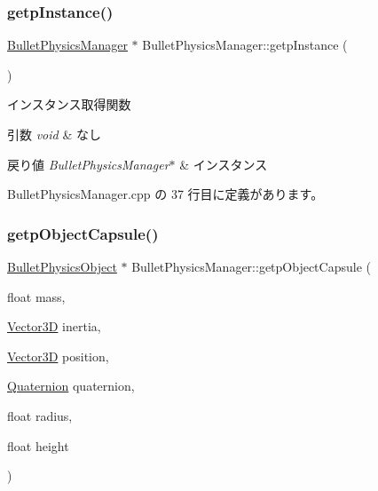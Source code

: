 \mbox{\label{class_bullet_physics_manager_a7ac6a8bba52b259931695ae85ded80d1}} 
\subsubsection{\texorpdfstring{getp\+Instance()}{getpInstance()}}
{\footnotesize\ttfamily \mbox{\hyperlink{class_bullet_physics_manager}{Bullet\+Physics\+Manager}} $\ast$ Bullet\+Physics\+Manager\+::getp\+Instance (\begin{DoxyParamCaption}{ }\end{DoxyParamCaption})\hspace{0.3cm}{\ttfamily [static]}}



インスタンス取得関数 


\begin{DoxyParams}{引数}
{\em void} & なし \\
\hline
\end{DoxyParams}

\begin{DoxyRetVals}{戻り値}
{\em Bullet\+Physics\+Manager$\ast$} & インスタンス \\
\hline
\end{DoxyRetVals}


 Bullet\+Physics\+Manager.\+cpp の 37 行目に定義があります。

\mbox{\label{class_bullet_physics_manager_aa923016c3a46597009f0b399dee189ec}} 
\subsubsection{\texorpdfstring{getp\+Object\+Capsule()}{getpObjectCapsule()}}
{\footnotesize\ttfamily \mbox{\hyperlink{class_bullet_physics_object}{Bullet\+Physics\+Object}} $\ast$ Bullet\+Physics\+Manager\+::getp\+Object\+Capsule (\begin{DoxyParamCaption}\item[{float}]{mass,  }\item[{\mbox{\hyperlink{class_vector3_d}{Vector3D}}}]{inertia,  }\item[{\mbox{\hyperlink{class_vector3_d}{Vector3D}}}]{position,  }\item[{\mbox{\hyperlink{_vector3_d_8h_a3ee38c9c46d9851e33a9a1113328dafc}{Quaternion}}}]{quaternion,  }\item[{float}]{radius,  }\item[{float}]{height }\end{DoxyParamCaption})}



